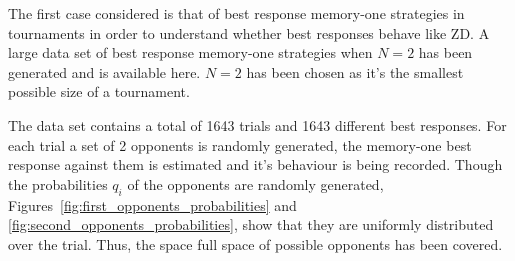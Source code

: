 \documentclass[10pt]{article}
\begin{document}
The first case considered is that of best response memory-one strategies in
tournaments in order to understand whether best responses behave like ZD. A
large data set of best response memory-one strategies when \(N=2\) has been
generated and is available here. \(N=2\) has been chosen as it's the smallest
possible size of a tournament.

The data set contains a total of 1643 trials and 1643 different best responses.
For each trial a set of 2 opponents is randomly generated, the memory-one best
response against them is estimated and it's behaviour is being recorded. Though
the probabilities \(q_i\) of the opponents are randomly generated,
Figures~\ref{fig:first_opponents_probabilities} and
\ref{fig:second_opponents_probabilities}, show that they are uniformly
distributed over the trial. Thus, the space full space of possible opponents has
been covered.
\end{document}
